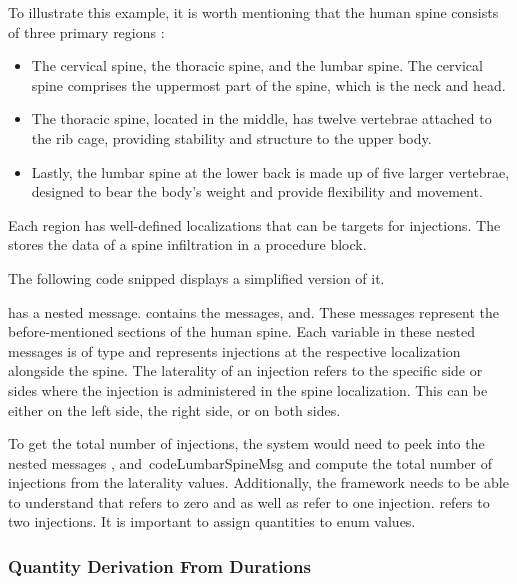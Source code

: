To illustrate this example, it is worth mentioning that the human spine consists of three primary regions \cite{BOGDUK2016675}:
\begin{itemize}
    \item The cervical spine, the thoracic spine, and the lumbar spine.
    The cervical spine comprises the uppermost part of the spine, which is the neck and head.
    \item The thoracic spine, located in the middle, has twelve vertebrae attached to the rib cage, providing stability and structure to the upper body.
    \item Lastly, the lumbar spine at the lower back is made up of five larger vertebrae, designed to bear the body's weight and provide flexibility and movement.
\end{itemize}
Each region has well-defined localizations that can be targets for injections.
The \AVS stores the data of a spine infiltration in a procedure block.

The following code snipped displays a simplified version of it.



 has a nested message.
 contains the messages, and.
These messages represent the before-mentioned sections of the human spine.
Each variable in these nested messages is of type and represents injections at the respective localization alongside the spine.
The laterality of an injection refers to the specific side or sides where the injection is administered in the spine localization.
This can be either on the left side, the right side, or on both sides.

To get the total number of injections, the system would need to peek into the nested messages ,  and\ code{LumbarSpineMsg} and compute the total number of injections from the laterality values.
Additionally, the framework needs to be able to understand that  refers to zero and  as well as refer to one injection.
 refers to two injections.
It is important to assign quantities to enum values.


\subsubsection{Quantity Derivation From Durations}\label{subsec:quantity-derivation-from-durations}

